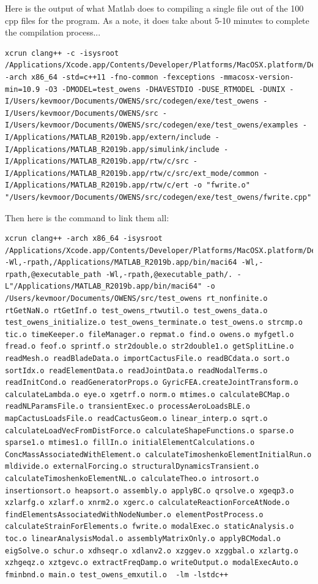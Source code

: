 \documentclass{article}
\begin{document}
Here is the output of what Matlab does to compiling a single file out of the 100 cpp files for the program.  As a note, it does take about 5-10 minutes to complete the compilation process...

\begin{lstlisting}
xcrun clang++ -c -isysroot /Applications/Xcode.app/Contents/Developer/Platforms/MacOSX.platform/Developer/SDKs/MacOSX10.13.sdk -arch x86_64 -std=c++11 -fno-common -fexceptions -mmacosx-version-min=10.9 -O3 -DMODEL=test_owens -DHAVESTDIO -DUSE_RTMODEL -DUNIX -I/Users/kevmoor/Documents/OWENS/src/codegen/exe/test_owens -I/Users/kevmoor/Documents/OWENS/src -I/Users/kevmoor/Documents/OWENS/src/codegen/exe/test_owens/examples -I/Applications/MATLAB_R2019b.app/extern/include -I/Applications/MATLAB_R2019b.app/simulink/include -I/Applications/MATLAB_R2019b.app/rtw/c/src -I/Applications/MATLAB_R2019b.app/rtw/c/src/ext_mode/common -I/Applications/MATLAB_R2019b.app/rtw/c/ert -o "fwrite.o" "/Users/kevmoor/Documents/OWENS/src/codegen/exe/test_owens/fwrite.cpp"
\end{lstlisting}

Then here is the command to link them all:

\begin{lstlisting}
xcrun clang++ -arch x86_64 -isysroot /Applications/Xcode.app/Contents/Developer/Platforms/MacOSX.platform/Developer/SDKs/MacOSX10.13.sdk -Wl,-rpath,/Applications/MATLAB_R2019b.app/bin/maci64 -Wl,-rpath,@executable_path -Wl,-rpath,@executable_path/. -L"/Applications/MATLAB_R2019b.app/bin/maci64" -o /Users/kevmoor/Documents/OWENS/src/test_owens rt_nonfinite.o rtGetNaN.o rtGetInf.o test_owens_rtwutil.o test_owens_data.o test_owens_initialize.o test_owens_terminate.o test_owens.o strcmp.o tic.o timeKeeper.o fileManager.o repmat.o find.o owens.o myfgetl.o fread.o feof.o sprintf.o str2double.o str2double1.o getSplitLine.o readMesh.o readBladeData.o importCactusFile.o readBCdata.o sort.o sortIdx.o readElementData.o readJointData.o readNodalTerms.o readInitCond.o readGeneratorProps.o GyricFEA.createJointTransform.o calculateLambda.o eye.o xgetrf.o norm.o mtimes.o calculateBCMap.o readNLParamsFile.o transientExec.o processAeroLoadsBLE.o mapCactusLoadsFile.o readCactusGeom.o linear_interp.o sqrt.o calculateLoadVecFromDistForce.o calculateShapeFunctions.o sparse.o sparse1.o mtimes1.o fillIn.o initialElementCalculations.o ConcMassAssociatedWithElement.o calculateTimoshenkoElementInitialRun.o mldivide.o externalForcing.o structuralDynamicsTransient.o calculateTimoshenkoElementNL.o calculateTheo.o introsort.o insertionsort.o heapsort.o assembly.o applyBC.o qrsolve.o xgeqp3.o xzlarfg.o xzlarf.o xnrm2.o xgerc.o calculateReactionForceAtNode.o findElementsAssociatedWithNodeNumber.o elementPostProcess.o calculateStrainForElements.o fwrite.o modalExec.o staticAnalysis.o toc.o linearAnalysisModal.o assemblyMatrixOnly.o applyBCModal.o eigSolve.o schur.o xdhseqr.o xdlanv2.o xzggev.o xzggbal.o xzlartg.o xzhgeqz.o xztgevc.o extractFreqDamp.o writeOutput.o modalExecAuto.o fminbnd.o main.o test_owens_emxutil.o  -lm -lstdc++
\end{lstlisting}
\end{document}
